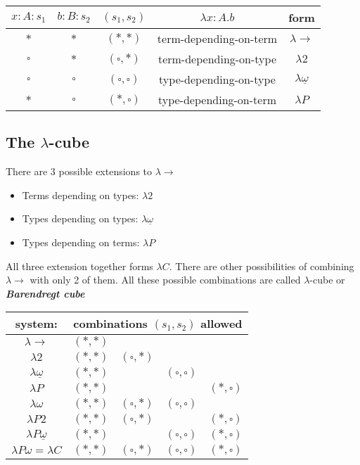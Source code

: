 \documentclass[12pt, a4paper]{article}
\begin{document}
\begin{center}
    \begin{tabular}{| c | c | c || c | c |} 
     \hline
     $x : A : s_1$ & $b : B : s_2$ & $(s_1, s_2)$ & $\lambda x : A. b$ & form \\
     \hline
     $*$ & $*$ & $(*,*)$ & term-depending-on-term & $\lambda \to$\\
     $\square$ & $*$ & $(\square,*)$ & term-depending-on-type & $\lambda 2$\\
     $\square$ & $\square$ & $(\square,\square)$ & type-depending-on-type & $\lambda \underline\omega$\\
     $*$ & $\square$ & $(*,\square)$ & type-depending-on-term & $\lambda P$\\
     \hline
   \end{tabular}
\end{center}

\subsection{The \texorpdfstring{$\lambda$-cube}{}}
There are 3 possible extensions to $\lambda \to$
\begin{itemize}
    \item Terms depending on types: $\lambda 2$
    \item Types depending on types: $\lambda \underline{\omega}$
    \item Types depending on terms: $\lambda P$
\end{itemize}

All three extension together forms $\lambda C$. There are other possibilities of combining $\lambda \to$ with only 2 of them.
All these possible combinations are called $\lambda$-cube or \textbf{\textit{Barendregt cube}}~\cite{barendregt}

\begin{center}
    \begin{tabular}{|c | c c c c |} 
    \multicolumn{1}{c}{system:} & \multicolumn{4}{c}{combinations $(s_1, s_2)$ allowed } \\
     \hline
     $\lambda\to$ & $(*,*)$ & & &\\
     $\lambda 2$ & $(*,*)$ & $(\square, *)$& &\\
     $\lambda\underline{\omega}$ & $(*,*)$ & & $(\square, \square)$ &\\
     $\lambda P$ & $(*,*)$ & & &$(*, \square)$\\
     $\lambda \omega$ & $(*,*)$ &$(\square, *)$ & $(\square, \square)$&\\
     $\lambda P 2$ & $(*,*)$ &$(\square, *)$ & &$(*, \square)$\\
     $\lambda P \underline \omega$ & $(*,*)$ & &$(\square, \square)$ &$(*, \square)$\\
     $\lambda P \omega = \lambda C$ & $(*,*)$ &$(\square, *)$ & $(\square, \square)$&$(*, \square)$\\
     \hline
   \end{tabular}
\end{center}
\end{document}
